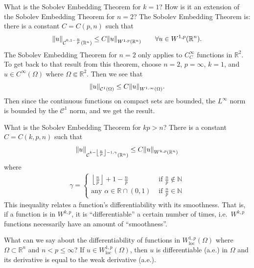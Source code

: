 \documentclass[avery5388,grid,frame]{flashcards}
\def\Rl{\mathbb{R}}
\begin{document}
\begin{flashcard}
    {What is the Sobolev Embedding Theorem for $k=1$?  How is it an extension of the Sobolev Embedding Theorem for $n=2$?}
    The Sobolev Embedding Theorem is: there is a constant $C = C(p,n)$ such that
    \begin{align*}
        \norm{u}_{\mathcal{C}^{0,1-\frac{n}{p}}(\Rl^n)} \leq C\norm{u}_{W^{1,p}(\Rl^n)} \qquad \forall u \in W^{1,p}(\Rl^n).
    \end{align*}
    The Sobolev Embedding Theorem for $n=2$ only applies to $C_C^\infty$ functions in $\Rl^2$.  To get back to that result from this theorem, choose $n=2$, $p=\infty$, $k=1$, and $u \in C^\infty(\Omega)$ where $\Omega \Subset \Rl^2$.  Then we see that
    \begin{align*}
        \norm{u}_{\mathcal{C}^1(\Omega)} \leq C\norm{u}_{W^{1,\infty}(\Omega)}.
    \end{align*}
    Then since the continuous functions on compact sets are bounded, the $L^\infty$ norm is bounded by the $\mathcal{C}^1$ norm, and we get the result.
\end{flashcard}

\begin{flashcard}
    {What is the Sobolev Embedding Theorem for $kp > n$?}
    There is a constant $C = C(k,p,n)$ such that
    \begin{align*}
        \norm{u}_{\mathcal{C}^{k - \left\lfloor\frac{n}{p}\right\rfloor - 1,\gamma}(\Rl^n)} \leq C\norm{u}_{W^{k,p}(\Rl^n)}
    \end{align*}
    where
    \begin{equation*}
        \begin{aligned}
            \gamma = \begin{cases}
                \left\lfloor\frac{n}{p}\right\rfloor + 1 - \frac{n}{p} & \text{ if } \frac{n}{p} \not\in \mathbb{N} \\
                \text{any } \alpha \in \Rl \cap (0,1) & \text{ if } \frac{n}{p} \in \mathbb{N}
            \end{cases}
        \end{aligned}
    \end{equation*}
    This inequality relates a function's differentiability with its smoothness.  That is, if a function is in $W^{k,p}$, it is ``differentiable'' a certain number of times, i.e.~$W^{k,p}$ functions necessarily have an amount of ``smoothness''.
\end{flashcard}

\begin{flashcard}
    {What can we say about the differentiability of functions in $W^{1,p}_\text{loc}(\Omega)$ where $\Omega \subset \Rl^n$ and $n < p \leq \infty$?}
    If $u \in W^{1,p}_\text{loc}(\Omega)$, then $u$ is differentiable (a.e.) in $\Omega$ and its derivative is equal to the weak derivative (a.e.).
\end{flashcard}
\end{document}
